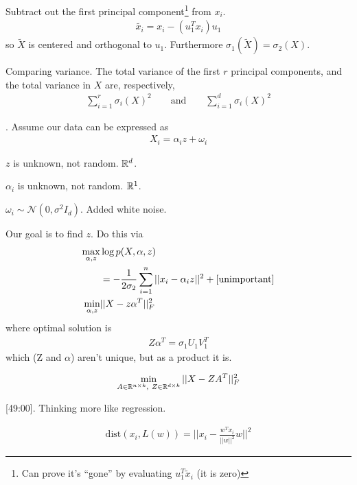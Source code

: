 \documentclass[12pt]{article}
\newcommand{\myspace}{\vspace{2\bigskipamount}}
\newcommand\p{\Needspace{10\baselineskip} \noindent}
\begin{document}
\p Subtract out the first principal component\footnote{Can prove it's ``gone'' by evaluating $u_1^T \widetilde{x}_i$ (it is zero)} from $x_i$.
\begin{align}
 \widetilde{x_i} = x_i - (u_1^T x_i) u_1
\end{align} 
so $\widetilde{X}$ is centered and orthogonal to $u_1$. Furthermore $\sigma_1(\widetilde{X}) = \sigma_2(X)$. 

\p Comparing variance. The total variance of the first $r$ principal components, and the total variance in $X$ are, respectively,
\begin{align}
	\sum_{i = 1}^{r} \sigma_i(X)^2 \qquad \text{and} \qquad \sum_{i = 1}^d \sigma_i(X)^2
\end{align}


\myspace
\p {}. Assume our data can be expressed as 
\begin{align}
	X_i = \alpha_i z + \omega_i 
\end{align}
\begin{compactitem}
	\item $z$ is unknown, not random. $\mathbb{R}^d$. 
	\item $\alpha_i$ is unknown, not random. $\mathbb{R}^1$. 
	\item $\omega_i \sim \mathcal{N}(0, \sigma^2 I_d)$. Added white noise.
\end{compactitem}
Our goal is to find $z$. Do this via
\begin{align}
\max_{\alpha, z} &\log p(X, \alpha, z) \\
&= - \frac{1}{2\sigma_2}\sum_{i=1}^{n} ||x_i - \alpha_i z||^2 + \text{[unimportant]} \\
\min_{\alpha, z} &||X - z\alpha^T||^2_F  
\end{align}
where optimal solution is 
\begin{align}
Z\alpha^T = \sigma_1 U_1 V_1^T
\end{align}
which (Z and $\alpha$) aren't unique, but as a product it is.

\begin{align}
\min_{A \in \mathbb{R}^{n\times k}, ~ Z \in \mathbb{R}^{d\times k}} || X - Z A^T ||_F^2 
\end{align}

\myspace
\p {} [49:00]. Thinking more like regression.

\begin{align}
\text{dist}(x_i, L(w)) = ||x_i - \frac{w^T x_i}{||w||^2}w||^2
\end{align}
\end{document}
